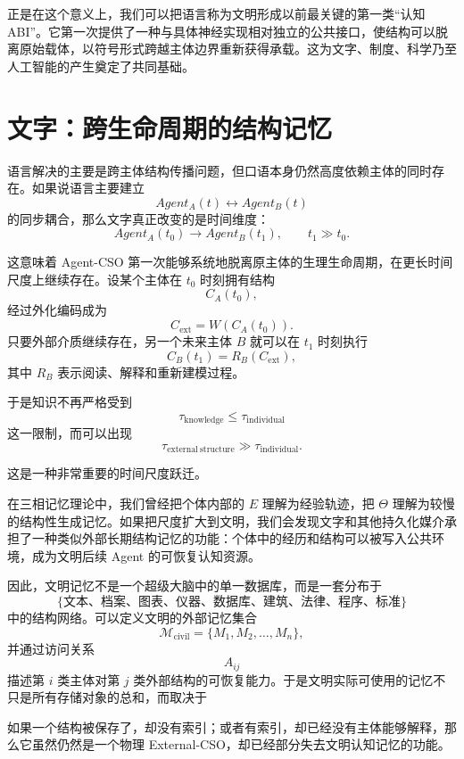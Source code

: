 正是在这个意义上，我们可以把语言称为文明形成以前最关键的第一类“认知 ABI”。它第一次提供了一种与具体神经实现相对独立的公共接口，使结构可以脱离原始载体，以符号形式跨越主体边界重新获得承载。这为文字、制度、科学乃至人工智能的产生奠定了共同基础。


\section{文字：跨生命周期的结构记忆}

语言解决的主要是跨主体结构传播问题，但口语本身仍然高度依赖主体的同时存在。如果说语言主要建立
\[
Agent_A(t)
\leftrightarrow
Agent_B(t)
\]
的同步耦合，那么文字真正改变的是时间维度：
\[
Agent_A(t_0)
\rightarrow
Agent_B(t_1),
\qquad
t_1\gg t_0.
\]

这意味着 Agent-CSO 第一次能够系统地脱离原主体的生理生命周期，在更长时间尺度上继续存在。设某个主体在 $t_0$ 时刻拥有结构
\[
C_A(t_0),
\]
经过外化编码成为
\[
C_{\mathrm{ext}}
=
W\left(C_A(t_0)\right).
\]
只要外部介质继续存在，另一个未来主体 $B$ 就可以在 $t_1$ 时刻执行
\[
C_B(t_1)
=
R_B(C_{\mathrm{ext}}),
\]
其中 $R_B$ 表示阅读、解释和重新建模过程。

于是知识不再严格受到
\[
\tau_{\mathrm{knowledge}}
\leq
\tau_{\mathrm{individual}}
\]
这一限制，而可以出现
\[
\tau_{\mathrm{external\ structure}}
\gg
\tau_{\mathrm{individual}}.
\]

这是一种非常重要的时间尺度跃迁。

在三相记忆理论中，我们曾经把个体内部的 $E$ 理解为经验轨迹，把 $\Theta$ 理解为较慢的结构性生成记忆。如果把尺度扩大到文明，我们会发现文字和其他持久化媒介承担了一种类似外部长期结构记忆的功能：个体中的经历和结构可以被写入公共环境，成为文明后续 Agent 的可恢复认知资源。

因此，文明记忆不是一个超级大脑中的单一数据库，而是一套分布于
\[
\{\text{文本、档案、图表、仪器、数据库、建筑、法律、程序、标准}\}
\]
中的结构网络。可以定义文明的外部记忆集合
\[
\mathcal{M}_{\mathrm{civil}}
=
\{M_1,M_2,\ldots,M_n\},
\]
并通过访问关系
\[
A_{ij}
\]
描述第 $i$ 类主体对第 $j$ 类外部结构的可恢复能力。于是文明实际可使用的记忆不只是所有存储对象的总和，而取决于
\begin{statementbox}
\centering
{}
\end{statementbox}

如果一个结构被保存了，却没有索引；或者有索引，却已经没有主体能够解释，那么它虽然仍然是一个物理 External-CSO，却已经部分失去文明认知记忆的功能。

